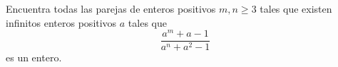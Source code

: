 Encuentra todas las parejas de enteros positivos $m,n\geq3$ tales que existen infinitos enteros positivos $a$ tales que \[ \frac{a^m+a-1}{a^n+a^2-1} \] es un entero.
